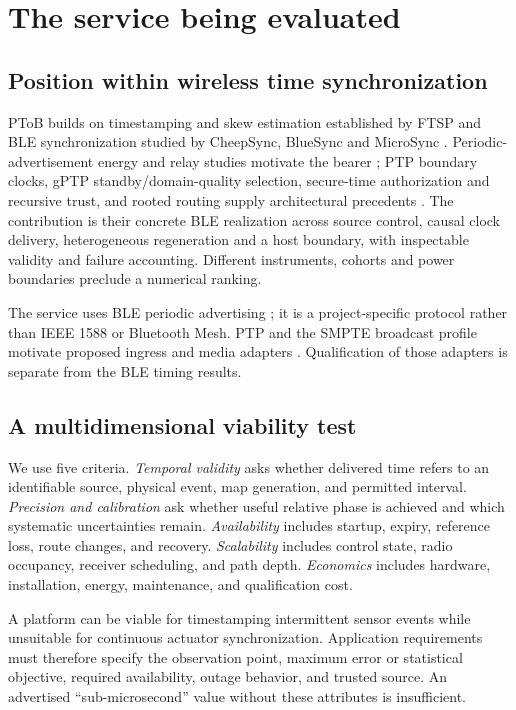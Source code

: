 \documentclass[11pt,letterpaper]{article}
\begin{document}
\section{The service being evaluated}
\subsection{Position within wireless time synchronization}
PToB builds on timestamping and skew estimation established by FTSP \cite{ftsp} and BLE synchronization studied by CheepSync, BlueSync and MicroSync \cite{cheep,bluesync,micro}. Periodic-advertisement energy and relay studies motivate the bearer \cite{paenergy,parelay}; PTP boundary clocks, gPTP standby/domain-quality selection, secure-time authorization and recursive trust, and rooted routing supply architectural precedents \cite{ptp,gptpstandby,securetime,rpl}. The contribution is their concrete BLE realization across source control, causal clock delivery, heterogeneous regeneration and a host boundary, with inspectable validity and failure accounting. Different instruments, cohorts and power boundaries preclude a numerical ranking.

The service uses BLE periodic advertising \cite{ble}; it is a project-specific protocol rather than IEEE 1588 or Bluetooth Mesh. PTP and the SMPTE broadcast profile motivate proposed ingress and media adapters \cite{ptp,smpte}. Qualification of those adapters is separate from the BLE timing results.

\subsection{A multidimensional viability test}
We use five criteria. \emph{Temporal validity} asks whether delivered time refers to an identifiable source, physical event, map generation, and permitted interval. \emph{Precision and calibration} ask whether useful relative phase is achieved and which systematic uncertainties remain. \emph{Availability} includes startup, expiry, reference loss, route changes, and recovery. \emph{Scalability} includes control state, radio occupancy, receiver scheduling, and path depth. \emph{Economics} includes hardware, installation, energy, maintenance, and qualification cost.

A platform can be viable for timestamping intermittent sensor events while unsuitable for continuous actuator synchronization. Application requirements must therefore specify the observation point, maximum error or statistical objective, required availability, outage behavior, and trusted source. An advertised ``sub-microsecond'' value without these attributes is insufficient.
\end{document}
